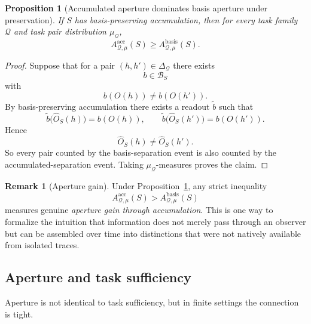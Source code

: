 \documentclass[11pt,twoside]{article}
\newtheorem{proposition}[theorem]{Proposition}
\theoremstyle{definition}
\newtheorem{remark}[theorem]{Remark}
\newcommand{\basis}{\mathrm{basis}}
\newcommand{\acc}{\mathrm{acc}}
\begin{document}
\begin{proposition}[Accumulated aperture dominates basis aperture under preservation]
\label{prop:acc-dominates-basis}
If \(S\) has basis-preserving accumulation, then for every task family \(\mathcal{Q}\) and task pair distribution \(\mu_{\mathcal{Q}}\),
\[
  A^{\acc}_{\mathcal{Q},\mu}(S)
  \ge
  A^{\basis}_{\mathcal{Q},\mu}(S).
\]
\end{proposition}

\begin{proof}
Suppose that for a pair \((h,h')\in\Delta_{\mathcal{Q}}\) there exists
\[
  b\in\mathcal{B}_S
\]
with
\[
  b(O(h)) \neq b(O(h')).
\]
By basis-preserving accumulation there exists a readout \(\widetilde{b}\) such that
\[
  \widetilde{b}\bigl(\widehat{O}_S(h)\bigr) = b(O(h)),
  \qquad
  \widetilde{b}\bigl(\widehat{O}_S(h')\bigr) = b(O(h')).
\]
Hence
\[
  \widehat{O}_S(h) \neq \widehat{O}_S(h').
\]
So every pair counted by the basis-separation event is also counted by the accumulated-separation event. Taking \(\mu_{\mathcal{Q}}\)-measures proves the claim.
\end{proof}

\begin{remark}[Aperture gain]
\label{rem:aperture-gain}
Under Proposition~\ref{prop:acc-dominates-basis}, any strict inequality
\[
  A^{\acc}_{\mathcal{Q},\mu}(S) >
  A^{\basis}_{\mathcal{Q},\mu}(S)
\]
measures genuine \emph{aperture gain through accumulation}. This is one way to formalize the intuition that information does not merely pass through an observer but can be assembled over time into distinctions that were not natively available from isolated traces.
\end{remark}

\subsection{Aperture and task sufficiency}
\label{subsec:aperture-and-task-sufficiency}

Aperture is not identical to task sufficiency, but in finite settings the connection is tight.
\end{document}
